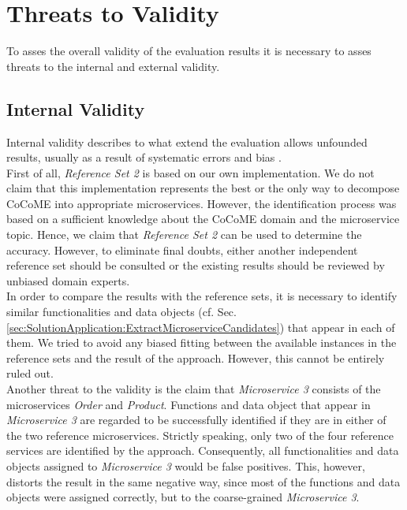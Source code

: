 \section{Threats to Validity}
\label{sec:Evalutation:ThreatsToValidity}
To asses the overall validity of the evaluation results it is necessary to asses threats to the internal and external validity. 


\subsection{Internal Validity}
Internal validity describes to what extend the evaluation allows unfounded results, usually as a result of systematic errors and bias \cite{Validity}. \\
First of all, \textit{Reference Set 2} is based on our own implementation. We do not claim that this implementation represents the best or the only way to decompose CoCoME into appropriate microservices. However, the identification process was based on a sufficient knowledge about the CoCoME domain and the microservice topic. Hence, we claim that \textit{Reference Set 2} can be used to determine the accuracy. However, to eliminate final doubts, either another independent reference set should be consulted or the existing results should be reviewed by unbiased domain experts. \\
In order to compare the results with the reference sets, it is necessary to identify similar functionalities and data objects (cf. Sec.\ref{sec:SolutionApplication:ExtractMicroserviceCandidates}) that appear in each of them. We tried to avoid any biased fitting between the available instances in the reference sets and the result of the approach. However, this cannot be entirely ruled out.\\
Another threat to the validity is the claim that \textit{Microservice 3} consists of the microservices \textit{Order} and \textit{Product}. Functions and data object that appear in \textit{Microservice 3} are regarded to be successfully identified if they are in either of the two reference microservices. Strictly speaking, only two of the four reference services are identified by the approach. Consequently, all functionalities and data objects assigned to \textit{Microservice 3} would be false positives. This, however, distorts the result in the same negative way, since most of the functions and data objects were assigned correctly, but to the coarse-grained \textit{Microservice 3}.




